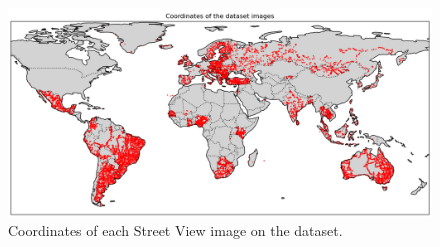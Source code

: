 \documentclass{article}
\begin{document}
\begin{figure}[H]
    \centering
    \includegraphics[width=0.9\linewidth]{coordinates.png}
    \caption{Coordinates of each Street View image on the dataset.}
    \label{fig:worldmap}
\end{figure}
\end{document}
